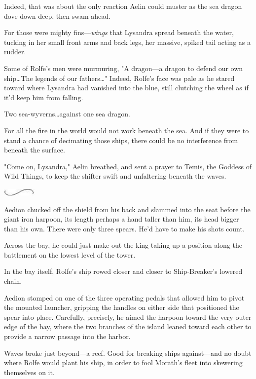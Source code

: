 Indeed, that was about the only reaction Aelin could muster as the sea dragon dove down deep, then swam ahead.

For those were mighty fins---\emph{wings} that Lysandra spread beneath the water, tucking in her small front arms and back legs, her massive, spiked tail acting as a rudder.

Some of Rolfe's men were murmuring, "A dragon---a dragon to defend our own ship\ldots The legends of our fathers\ldots" Indeed, Rolfe's face was pale as he stared toward where Lysandra had vanished into the blue, still clutching the wheel as if it'd keep him from falling.

Two sea-wyverns\ldots against one sea dragon.

For all the fire in the world would not work beneath the sea.
And if they were to stand a chance of decimating those ships, there could be no interference from beneath the surface.

"Come on, Lysandra," Aelin breathed, and sent a prayer to Temis, the Goddess of Wild Things, to keep the shifter swift and unfaltering beneath the waves.

\begin{center}
	\includegraphics[width=0.65in,height=0.13in]{images/seperator}
\end{center}

Aedion chucked off the shield from his back and slammed into the seat before the giant iron harpoon, its length perhaps a hand taller than him, its head bigger than his own.
There were only three spears.
He'd have to make his shots count.

Across the bay, he could just make out the king taking up a position along the battlement on the lowest level of the tower.

In the bay itself, Rolfe's ship rowed closer and closer to Ship-Breaker's lowered chain.

Aedion stomped on one of the three operating pedals that allowed him to pivot the mounted launcher, gripping the handles on either side that positioned the spear into place.
Carefully, precisely, he aimed the harpoon toward the very outer edge of the bay, where the two branches of the island leaned toward each other to provide a narrow passage into the harbor.

Waves broke just beyond---a reef.
Good for breaking ships against---and no doubt where Rolfe would plant his ship, in order to fool Morath's fleet into skewering themselves on it.


